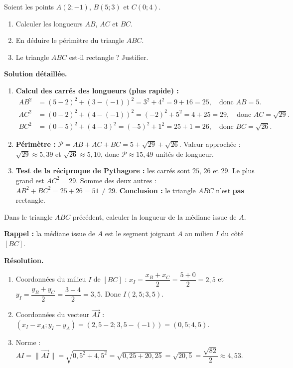 \documentclass[11pt]{article}
\begin{document}
\begin{exoresolu}
Soient les points $A(2 ; -1)$, $B(5 ; 3)$ et $C(0 ; 4)$.
\begin{enumerate}
    \item Calculer les longueurs $AB$, $AC$ et $BC$.
    \item En déduire le périmètre du triangle $ABC$.
    \item Le triangle $ABC$ est-il rectangle ? Justifier.
\end{enumerate}
\tcblower
\textbf{Solution détaillée.}
\begin{enumerate}
    \item \textbf{Calcul des carrés des longueurs (plus rapide) :}
    \begin{align*}
    AB^2 &= (5-2)^2 + (3-(-1))^2 = 3^2 + 4^2 = 9 + 16 = 25, \quad \text{donc } AB = 5. \\
    AC^2 &= (0-2)^2 + (4-(-1))^2 = (-2)^2 + 5^2 = 4 + 25 = 29, \quad \text{donc } AC = \sqrt{29}. \\
    BC^2 &= (0-5)^2 + (4-3)^2 = (-5)^2 + 1^2 = 25 + 1 = 26, \quad \text{donc } BC = \sqrt{26}.
    \end{align*}
    \item \textbf{Périmètre :} $\mathcal{P} = AB + AC + BC = 5 + \sqrt{29} + \sqrt{26}$.
    Valeur approchée : $\sqrt{29} \approx 5,39$ et $\sqrt{26} \approx 5,10$, donc $\mathcal{P} \approx 15,49$ unités de longueur.
    \item \textbf{Test de la réciproque de Pythagore :} les carrés sont $25$, $26$ et $29$. Le plus grand est $AC^2 = 29$.
    Somme des deux autres : $AB^2 + BC^2 = 25 + 26 = 51 \neq 29$.
    \textbf{Conclusion :} le triangle $ABC$ n'est \textbf{pas} rectangle.
\end{enumerate}
\end{exoresolu}

\begin{exemplebox}
Dans le triangle $ABC$ précédent, calculer la longueur de la médiane issue de $A$.

\textbf{Rappel :} la médiane issue de $A$ est le segment joignant $A$ au milieu $I$ du côté $[BC]$.

\textbf{Résolution.}
\begin{enumerate}
    \item Coordonnées du milieu $I$ de $[BC]$ :
    $x_I = \dfrac{x_B+x_C}{2} = \dfrac{5+0}{2} = 2,5$ et $y_I = \dfrac{y_B+y_C}{2} = \dfrac{3+4}{2} = 3,5$.
    Donc $I(2,5 ; 3,5)$.
    \item Coordonnées du vecteur $\overrightarrow{AI}$ : $(x_I-x_A ; y_I-y_A) = (2,5-2 ; 3,5-(-1)) = (0,5 ; 4,5)$.
    \item Norme : $AI = \|\overrightarrow{AI}\| = \sqrt{0,5^2 + 4,5^2} = \sqrt{0,25 + 20,25} = \sqrt{20,5} = \dfrac{\sqrt{82}}{2} \approx 4,53$.
\end{enumerate}
\end{exemplebox}
\end{document}
